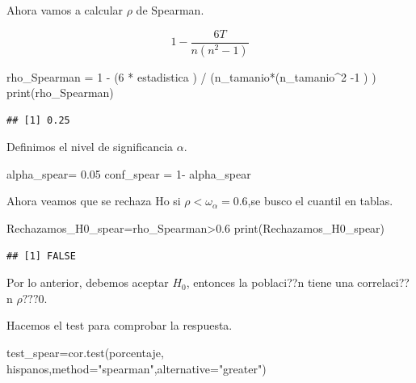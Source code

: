 \documentclass[
]{article}
\newenvironment{Shaded}{\begin{snugshade}}{\end{snugshade}}
\newcommand{\AttributeTok}[1]{\textcolor[rgb]{0.77,0.63,0.00}{#1}}
\newcommand{\DecValTok}[1]{\textcolor[rgb]{0.00,0.00,0.81}{#1}}
\newcommand{\FloatTok}[1]{\textcolor[rgb]{0.00,0.00,0.81}{#1}}
\newcommand{\FunctionTok}[1]{\textcolor[rgb]{0.00,0.00,0.00}{#1}}
\newcommand{\NormalTok}[1]{#1}
\newcommand{\OtherTok}[1]{\textcolor[rgb]{0.56,0.35,0.01}{#1}}
\newcommand{\SpecialCharTok}[1]{\textcolor[rgb]{0.00,0.00,0.00}{#1}}
\newcommand{\StringTok}[1]{\textcolor[rgb]{0.31,0.60,0.02}{#1}}
\begin{document}
Ahora vamos a calcular \(\rho\) de Spearman.

\[ 1- \frac{6T}{n(n^{2}-1 )}\]

\begin{Shaded}
\begin{Highlighting}[]
\NormalTok{rho\_Spearman }\OtherTok{=} \DecValTok{1} \SpecialCharTok{{-}}\NormalTok{ (}\DecValTok{6} \SpecialCharTok{*}\NormalTok{ estadistica ) }\SpecialCharTok{/}\NormalTok{ (n\_tamanio}\SpecialCharTok{*}\NormalTok{(n\_tamanio}\SpecialCharTok{\^{}}\DecValTok{2} \SpecialCharTok{{-}}\DecValTok{1}\NormalTok{ ) )}
\FunctionTok{print}\NormalTok{(rho\_Spearman)}
\end{Highlighting}
\end{Shaded}

\begin{verbatim}
## [1] 0.25
\end{verbatim}

Definimos el nivel de significancia \(\alpha\).

\begin{Shaded}
\begin{Highlighting}[]
\NormalTok{alpha\_spear}\OtherTok{=} \FloatTok{0.05}
\NormalTok{conf\_spear }\OtherTok{=} \DecValTok{1}\SpecialCharTok{{-}}\NormalTok{ alpha\_spear }
\end{Highlighting}
\end{Shaded}

Ahora veamos que se rechaza Ho si \(\rho < \omega_{\alpha}= 0.6\),se
busco el cuantil en tablas.

\begin{Shaded}
\begin{Highlighting}[]
\NormalTok{Rechazamos\_H0\_spear}\OtherTok{=}\NormalTok{rho\_Spearman}\SpecialCharTok{\textgreater{}}\FloatTok{0.6}
\FunctionTok{print}\NormalTok{(Rechazamos\_H0\_spear)}
\end{Highlighting}
\end{Shaded}

\begin{verbatim}
## [1] FALSE
\end{verbatim}

Por lo anterior, debemos aceptar \(H_{0}\), entonces la poblaci??n tiene
una correlaci??n \(\rho ??? 0\).

Hacemos el test para comprobar la respuesta.

\begin{Shaded}
\begin{Highlighting}[]
\NormalTok{test\_spear}\OtherTok{=}\FunctionTok{cor.test}\NormalTok{(porcentaje, hispanos,}\AttributeTok{method=}\StringTok{"spearman"}\NormalTok{,}\AttributeTok{alternative=}\StringTok{"greater"}\NormalTok{)}
\end{Highlighting}
\end{Shaded}
\end{document}
